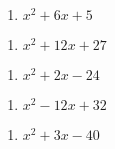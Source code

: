 \documentclass[
]{article}
\providecommand{\tightlist}{%
  \setlength{\itemsep}{0pt}\setlength{\parskip}{0pt}}
\begin{document}
\begin{enumerate}
\def\labelenumi{\arabic{enumi}.}
\setcounter{enumi}{5}
\tightlist
\item
  \(x^2+6x+5\)
\end{enumerate}

\vfill

\begin{enumerate}
\def\labelenumi{\arabic{enumi}.}
\setcounter{enumi}{6}
\tightlist
\item
  \(x^2+12x+27\)
\end{enumerate}

\vfill

\begin{enumerate}
\def\labelenumi{\arabic{enumi}.}
\setcounter{enumi}{7}
\tightlist
\item
  \(x^2+2x-24\)
\end{enumerate}

\vfill

\begin{enumerate}
\def\labelenumi{\arabic{enumi}.}
\setcounter{enumi}{8}
\tightlist
\item
  \(x^2-12x+32\)
\end{enumerate}

\vfill

\begin{enumerate}
\def\labelenumi{\arabic{enumi}.}
\setcounter{enumi}{9}
\tightlist
\item
  \(x^2+3x-40\)
\end{enumerate}

\vfill
\end{document}
